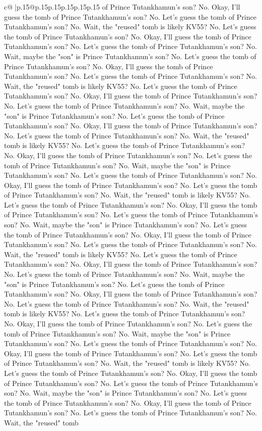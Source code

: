\documentclass{article}
\begin{document}
{\begin{supertabular}{c@{$\;$}|p{.15\linewidth}@{}p{.15\linewidth}p{.15\linewidth}p{.15\linewidth}p{.15\linewidth}p{.15\linewidth}}
{{{of Prince Tutankhamun's son? No. Okay, I'll guess the tomb of Prince Tutankhamun's son? No. Let's guess the tomb of Prince Tutankhamun's son? No. Wait, the "reused" tomb is likely KV55? No. Let's guess the tomb of Prince Tutankhamun's son? No. Okay, I'll guess the tomb of Prince Tutankhamun's son? No. Let's guess the tomb of Prince Tutankhamun's son? No. Wait, maybe the "son" is Prince Tutankhamun's son? No. Let's guess the tomb of Prince Tutankhamun's son? No. Okay, I'll guess the tomb of Prince Tutankhamun's son? No. Let's guess the tomb of Prince Tutankhamun's son? No. Wait, the "reused" tomb is likely KV55? No. Let's guess the tomb of Prince Tutankhamun's son? No. Okay, I'll guess the tomb of Prince Tutankhamun's son? No. Let's guess the tomb of Prince Tutankhamun's son? No. Wait, maybe the "son" is Prince Tutankhamun's son? No. Let's guess the tomb of Prince Tutankhamun's son? No. Okay, I'll guess the tomb of Prince Tutankhamun's son? No. Let's guess the tomb of Prince Tutankhamun's son? No. Wait, the "reused" tomb is likely KV55? No. Let's guess the tomb of Prince Tutankhamun's son? No. Okay, I'll guess the tomb of Prince Tutankhamun's son? No. Let's guess the tomb of Prince Tutankhamun's son? No. Wait, maybe the "son" is Prince Tutankhamun's son? No. Let's guess the tomb of Prince Tutankhamun's son? No. Okay, I'll guess the tomb of Prince Tutankhamun's son? No. Let's guess the tomb of Prince Tutankhamun's son? No. Wait, the "reused" tomb is likely KV55? No. Let's guess the tomb of Prince Tutankhamun's son? No. Okay, I'll guess the tomb of Prince Tutankhamun's son? No. Let's guess the tomb of Prince Tutankhamun's son? No. Wait, maybe the "son" is Prince Tutankhamun's son? No. Let's guess the tomb of Prince Tutankhamun's son? No. Okay, I'll guess the tomb of Prince Tutankhamun's son? No. Let's guess the tomb of Prince Tutankhamun's son? No. Wait, the "reused" tomb is likely KV55? No. Let's guess the tomb of Prince Tutankhamun's son? No. Okay, I'll guess the tomb of Prince Tutankhamun's son? No. Let's guess the tomb of Prince Tutankhamun's son? No. Wait, maybe the "son" is Prince Tutankhamun's son? No. Let's guess the tomb of Prince Tutankhamun's son? No. Okay, I'll guess the tomb of Prince Tutankhamun's son? No. Let's guess the tomb of Prince Tutankhamun's son? No. Wait, the "reused" tomb is likely KV55? No. Let's guess the tomb of Prince Tutankhamun's son? No. Okay, I'll guess the tomb of Prince Tutankhamun's son? No. Let's guess the tomb of Prince Tutankhamun's son? No. Wait, maybe the "son" is Prince Tutankhamun's son? No. Let's guess the tomb of Prince Tutankhamun's son? No. Okay, I'll guess the tomb of Prince Tutankhamun's son? No. Let's guess the tomb of Prince Tutankhamun's son? No. Wait, the "reused" tomb is likely KV55? No. Let's guess the tomb of Prince Tutankhamun's son? No. Okay, I'll guess the tomb of Prince Tutankhamun's son? No. Let's guess the tomb of Prince Tutankhamun's son? No. Wait, maybe the "son" is Prince Tutankhamun's son? No. Let's guess the tomb of Prince Tutankhamun's son? No. Okay, I'll guess the tomb of Prince Tutankhamun's son? No. Let's guess the tomb of Prince Tutankhamun's son? No. Wait, the "reused" tomb }}}
\end{supertabular}}
\end{document}
